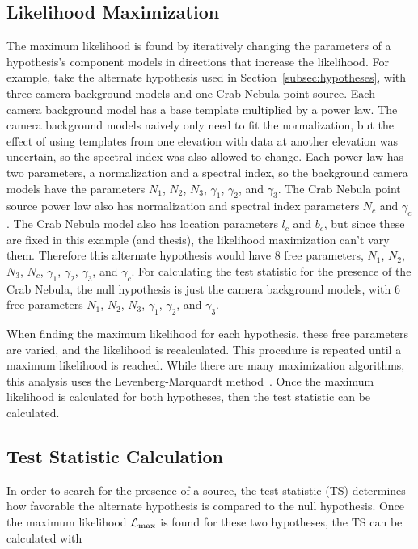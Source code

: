 \subsection{Likelihood Maximization}\label{subsec:likemax}
The maximum likelihood is found by iteratively changing the parameters of a hypothesis's component models in directions that increase the likelihood.
For example, take the alternate hypothesis used in Section~\ref{subsec:hypotheses}, with three camera background models and one Crab Nebula point source.
Each camera background model has a base template multiplied by a power law.
The camera background models naively only need to fit the normalization, but the effect of using templates from one elevation with data at another elevation was uncertain, so the spectral index was also allowed to change.
Each power law has two parameters, a normalization and a spectral index, so the background camera models have the parameters $N_1$, $N_2$, $N_3$, $\gamma_1$, $\gamma_2$, and $\gamma_3$.
The Crab Nebula point source power law also has normalization and spectral index parameters $N_c$ and $\gamma_c$.
The Crab Nebula model also has location parameters $l_c$ and $b_c$, but since these are fixed in this example (and thesis), the likelihood maximization can't vary them.
Therefore this alternate hypothesis would have 8 free parameters, $N_1$, $N_2$, $N_3$, $N_c$, $\gamma_1$, $\gamma_2$, $\gamma_3$, and $\gamma_c$.
For calculating the test statistic for the presence of the Crab Nebula, the null hypothesis is just the camera background models, with 6 free parameters $N_1$, $N_2$, $N_3$, $\gamma_1$, $\gamma_2$, and $\gamma_3$.

When finding the maximum likelihood for each hypothesis, these free parameters are varied, and the likelihood is recalculated.
This procedure is repeated until a maximum likelihood is reached.
While there are many maximization algorithms, this analysis uses the Levenberg-Marquardt method~\cite{marquardt1963algorithm}.
Once the maximum likelihood is calculated for both hypotheses, then the test statistic can be calculated.

\subsection{Test Statistic Calculation}

In order to search for the presence of a source, the test statistic (TS) determines how favorable the alternate hypothesis is compared to the null hypothesis.
Once the maximum likelihood $\mathcal{L}_{\textrm{max}}$ is found for these two hypotheses, the TS can be calculated with

